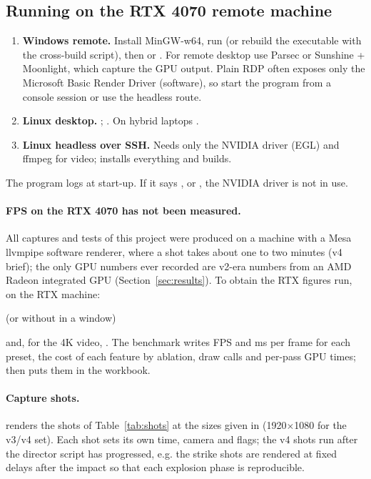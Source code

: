 \subsection{Running on the RTX 4070 remote machine}
\begin{enumerate}
  \item \textbf{Windows remote.} Install MinGW-w64, run  (or rebuild the executable with the cross-build script), then
   or . For remote desktop use Parsec or Sunshine + Moonlight, which capture the GPU output. Plain RDP often
  exposes only the Microsoft Basic Render Driver (software), so start the program from a console session or use the headless route.
  \item \textbf{Linux desktop.} ; . On hybrid laptops
  .
  \item \textbf{Linux headless over SSH.} Needs only the NVIDIA driver (EGL) and ffmpeg for video;  installs everything and builds.
\end{enumerate}
The program logs  at start-up. If it says ,  or , the NVIDIA driver is not in use.

\paragraph{FPS on the RTX 4070 has not been measured.} All captures and tests of this project were produced on a machine with a Mesa llvmpipe software renderer, where
a shot takes about one to two minutes (v4 brief); the only GPU numbers ever recorded are v2-era numbers from an AMD Radeon integrated GPU (Section~\ref{sec:results}). To obtain the RTX figures run, on the RTX machine:
\begin{center}\small
{}\quad (or without  in a window)
\end{center}
and, for the 4K video, .
The benchmark writes FPS and ms per frame for each preset, the cost of each feature by ablation, draw calls and per-pass GPU times;  then puts them in the workbook.

\paragraph{Capture shots.}  renders the shots of Table~\ref{tab:shots} at the sizes given in  (1920$\times$1080 for the v3/v4 set). Each shot sets its own time, camera
and flags; the v4 shots run after the director script has progressed, e.g. the strike shots are rendered at fixed delays after the impact so that each explosion phase is reproducible.
